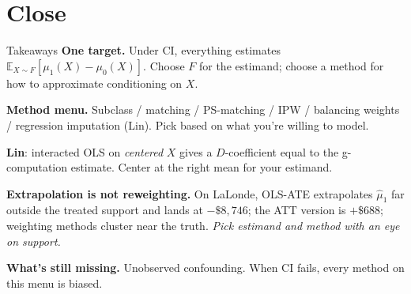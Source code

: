 \documentclass[xcolor=dvipsnames]{beamer}
\newcommand\E{\mathbb{E}}
\begin{document}


\section{Close}

\begin{frame}{Takeaways}
\small
{} \textbf{One target.} Under CI, everything estimates $\E_{X\sim F}[\mu_1(X) - \mu_0(X)]$. Choose $F$ for the estimand; choose a method for how to approximate conditioning on $X$.

\medskip
{} \textbf{Method menu.} Subclass / matching / PS-matching / IPW / balancing weights / regression imputation (Lin). Pick based on what you're willing to model.

\medskip
{} \textbf{Lin}: interacted OLS on \textit{centered} $X$ gives a $D$-coefficient equal to the g-computation estimate. Center at the right mean for your estimand.

\medskip
{} \textbf{Extrapolation is not reweighting.} On LaLonde, OLS-ATE extrapolates $\widehat\mu_1$ far outside the treated support and lands at $-\$8{,}746$; the ATT version is $+\$688$; weighting methods cluster near the truth. \textit{Pick estimand and method with an eye on support.}

\medskip
{} \textbf{What's still missing.} Unobserved confounding. When CI fails, every method on this menu is biased.
\end{frame}
\end{document}

